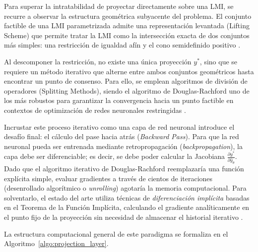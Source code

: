Para superar la intratabilidad de proyectar directamente sobre una LMI, se recurre a observar la estructura geométrica subyacente del problema. El conjunto factible de una LMI parametrizada admite una representación levantada (Lifting Scheme) que permite tratar la LMI como la intersección exacta de dos conjuntos más simples: una restricción de igualdad afín y el cono semidefinido positivo \cite{tang2026lminet}.

Al descomponer la restricción, no existe una única proyección $y^*$, sino que se requiere un método iterativo que alterne entre ambos conjuntos geométricos hasta encontrar un punto de consenso. Para ello, se emplean algoritmos de división de operadores (Splitting Methods), siendo el algoritmo de Douglas-Rachford uno de los más robustos para garantizar la convergencia hacia un punto factible en contextos de optimización de redes neuronales restringidas \cite{tang2026lminet}.

Incrustar este proceso iterativo como una capa de red neuronal introduce el desafío final: el cálculo del pase hacia atrás (\textit{Backward Pass}). Para que la red neuronal pueda ser entrenada mediante retropropagación (\textit{backpropagation}), la capa debe ser diferenciable; es decir, se debe poder calcular la Jacobiana $\frac{\partial y^*}{\partial \hat{y}_\theta}$. Dado que el algoritmo iterativo de Douglas-Rachford reemplazaría una función explícita simple, evaluar gradientes a través de cientos de iteraciones (desenrollado algorítmico o \textit{unrolling}) agotaría la memoria computacional. Para solventarlo, el estado del arte utiliza técnicas de \textit{diferenciación implícita} basadas en el Teorema de la Función Implícita, calculando el gradiente analíticamente en el punto fijo de la proyección sin necesidad de almacenar el historial iterativo \cite{grontas2026pinet, tang2026lminet}.

La estructura computacional general de este paradigma se formaliza en el Algoritmo~\ref{algo:projection_layer}.


